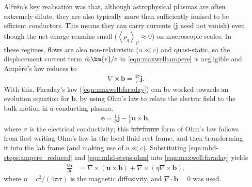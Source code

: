 \documentclass[12pt,twoside]{extreport}
\makeatletter
\newcommand{\mAve}[1]{\left\langle #1 \right\rangle} %
\newcommand{\mDiv}[1]{\nabla \cdot #1} %
\newcommand{\mCurl}[1]{\nabla \times #1} %
\newcommand{\mVector}[1]{\bm{#1}} %
\newcommand{\mpp}[1]{\partial #1}
\newcommand{\mppFrac}[2]{\frac{\mpp{#1}}{\mpp{#2}}}
\newcommand{\mVolume}{\ensuremath{\mathcal{V}}} %
\providecommand{\DIFdeltex}[1]{{\protect\color{DIFpurple}\sout{#1}}} %
\providecommand{\DIFdelbegin}{} %
\providecommand{\DIFdelend}{} %
\providecommand{\DIFdel}[1]{\texorpdfstring{\DIFdeltex{#1}}{}} %
\providecommand{\DIFscaledelfig}{0.5}
\newlength{\DIFdelgraphicswidth} %
\newlength{\DIFdelgraphicsheight} %
\providecommand{\DIFdelincludegraphics}[2][]{%
\sbox{\DIFdelgraphicsbox}{\DIFOincludegraphics[#1]{#2}}%
\settoboxwidth{\DIFdelgraphicswidth}{\DIFdelgraphicsbox} %
\settoboxtotalheight{\DIFdelgraphicsheight}{\DIFdelgraphicsbox} %
\scalebox{\DIFscaledelfig}{%
\parbox[b]{\DIFdelgraphicswidth}{\usebox{\DIFdelgraphicsbox}\\[-\baselineskip] \rule{\DIFdelgraphicswidth}{0em}}\llap{\resizebox{\DIFdelgraphicswidth}{\DIFdelgraphicsheight}{%
\setlength{\unitlength}{\DIFdelgraphicswidth}%
\begin{picture}(1,1)%
\thicklines\linethickness{2pt} %
{\color{DIFpurple}\put(0,0){\framebox(1,1){}}}%
{\color{DIFpurple}\put(0,0){\line( 1,1){1}}}%
{\color{DIFpurple}\put(0,1){\line(1,-1){1}}}%
\end{picture}%
}\hspace*{3pt}}} %
} %
\DeclareRobustCommand{\DIFdelbegin}{\DIFOdelbegin \let\includegraphics\DIFdelincludegraphics} %
\DeclareRobustCommand{\DIFdelend}{\DIFOaddend \let\includegraphics\DIFOincludegraphics} %
\let\sout@orig\sout %
\renewcommand{\sout}[1]{\ifmmode\text{\sout@orig{\ensuremath{#1}}}\else\sout@orig{#1}\fi} %
\makeatother
\begin{document}
Alfv\'en's key realisation was that, although astrophysical plasmas are often extremely dilute, they are also typically more than sufficiently ionised to be efficient conductors. This means they can carry currents ($\mVector{j}$ need not vanish) even though the net charge remains small ($\mAve{\rho_q}_\mVolume \approx 0$) on macroscopic scales. In these regimes, flows are also non-relativistic ($u \ll c$) and quasi-static, so the displacement current term $\mpp_t \mVector{e} / c$ in \autoref{eqn:maxwell:ampere} is negligible and Amp\`ere's law reduces to
\begin{align}
    \mCurl{\mVector{b}}
        = \frac{4\pi}{c} \mVector{j}
        . \label{eqn:mhd-steps:ampere_reduced}
\end{align}
With this, Faraday's law (\autoref{eqn:maxwell:faraday}) can be worked towards an evolution equation for $\mVector{b}$, by using Ohm's law to relate the electric field to the bulk motion in a conducting plasma,
\begin{align}
    \mVector{e}
        = \frac{1}{\sigma} \mVector{j} - \frac{1}{c} \mVector{u}\times\mVector{b}
        ,
    \label{eqn:mhd-steps:ohm}
\end{align}
where $\sigma$ is the electrical conductivity; this \DIFdelbegin \DIFdel{lab-frame }\DIFdelend form of Ohm's law follows from first writing Ohm's law in the local fluid rest frame, and then transforming it into the lab frame (and making use of $u \ll c$). Substituting \autoref{eqn:mhd-steps:ampere_reduced} and \autoref{eqn:mhd-steps:ohm} into \autoref{eqn:maxwell:faraday} yields
\begin{align}
    \mppFrac{\mVector{b}}{t}
        &= \mCurl{(\mVector{u}\times\mVector{b})}
            + \mCurl{(\eta \mCurl{\mVector{b}})}
            , \label{eqn:mhd-steps:induction}
\end{align}
where $\eta = c^2/(4\pi\sigma)$ is the magnetic diffusivity, and $\mDiv{\mVector{b}} = 0$ was used.
\end{document}
